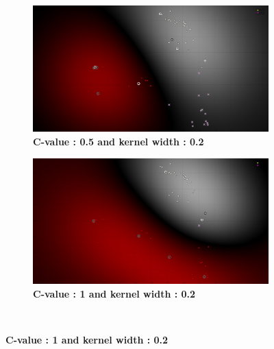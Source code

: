 \begin{figure}[!ht]
\centering
\begin{subfigure}[h]{0.31\textwidth}
\includegraphics[height=0.11\textheight]{./classification/SVM_rbf_w_0_2_c_0_5_TR_25_.png}
\caption{\bf C-value : 0.5 and kernel width : 0.2}
\label{fig:SVM_rbf_w_0_2_c_0_5_TR_25_}
\end{subfigure}
\hspace{20mm}
\begin{subfigure}[h]{0.31\textwidth}
\includegraphics[height=0.11\textheight]{./classification/SVM_rbf_w_0_2_c_1_TR_25_.png}
\caption{\bf C-value : 1 and kernel width : 0.2}
\label{fig:SVM_rbf_w_0_2_c_1_TR_25_}
\end{subfigure}\\


\end{figure}
